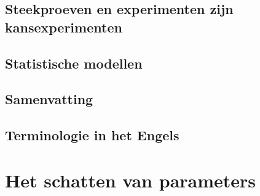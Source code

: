 \documentclass[
  a4paper,
]{scrbook}
\theoremstyle{definition}
\theoremstyle{definition}
\theoremstyle{remark}
\begin{document}
\section{Steekproeven en experimenten zijn
kansexperimenten}\label{steekproeven-en-experimenten-zijn-kansexperimenten}

\section{Statistische modellen}\label{statistische-modellen}

\section{Samenvatting}\label{samenvatting-1}

\section{Terminologie in het Engels}\label{terminologie-in-het-engels-1}

\chapter{Het schatten van parameters}\label{het-schatten-van-parameters}

\renewcommand{\ttdefault}{lcmtt}
\providecommand{\ped}[1]{_\textrm{#1}}
\providecommand{\ap}[1]{^\textrm{#1}}
\providecommand{\app}[1]{^\textrm{#1}}

\providecommand*{\angs}{\smash{\mathrm{\ring A}}}
\providecommand*{\celsius}{\mathrm{~\circ C}}
\providecommand*{\micro}{\mu}

\providecommand*{\unit}[1]{\textrm{\,#1}}

\providecommand{\E}{\mathrm{e}}
\providecommand{\I}{\mathrm{i}}
\providecommand{\sfrac}[2]{^{#1}/_{#2}}

\providecommand{\conc}[1]{\left[\mathrm{#1}\right]}

\providecommand{\command}[1]{\textsl{#1}}
\providecommand{\out}[1]{\begin{verbatim}#1\end{verbatim}}

\providecommand{\diff}{\mathrm{d}\,}

\providecommand*{\deriv}[3][]{%
    \frac{\diff^{#1}#2}{\diff #3^{#1}}}
\providecommand*{\pderiv}[3][]{%
    \frac{\partial^{#1}#2}
        {\partial #3^{#1}}}
\end{document}
